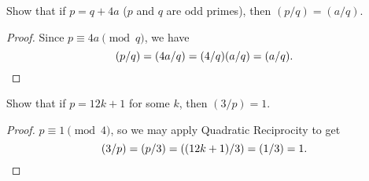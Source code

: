  Show that if $p = q + 4a$ ($p$ and $q$ are odd primes),
then $(p/q) = (a/q)$.
\begin{proof}
  Since $p\equiv4a\pmod{q}$, we have
  \begin{equation*}
    (p/q) = (4a/q) = (4/q)(a/q) = (a/q). \qedhere
  \end{equation*}
\end{proof}

 Show that if $p = 12k + 1$ for some $k$, then
$(3/p) = 1$.
\begin{proof}
  $p\equiv1\pmod4$, so we may apply Quadratic Reciprocity to get
  \begin{equation*}
    (3/p) = (p/3) = ((12k+1)/3) = (1/3) = 1. \qedhere
  \end{equation*}
\end{proof}
